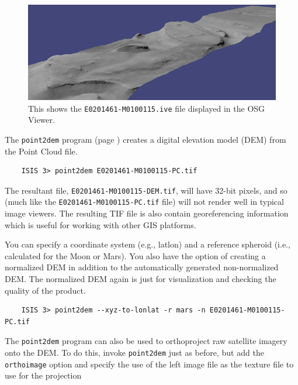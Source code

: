 \begin{figure}[t]
\begin{minipage}{5in}
\includegraphics[width=5in]{images/p19-osg.png}
\end{minipage}
\hfill
\begin{minipage}{1.7in}
\caption[P19 in OSG]{
    \label{p19-osg}
	This shows the \texttt{E0201461-M0100115.ive} file displayed in
	the OSG Viewer.
    }
\end{minipage}
\end{figure}

The \texttt{point2dem} program (page \pageref{point2dem}) creates
a digital elevation model (DEM) from the Point Cloud file.

\begin{verbatim}
    ISIS 3> point2dem E0201461-M0100115-PC.tif
\end{verbatim}

The resultant file, \texttt{E0201461-M0100115-DEM.tif}, will have
32-bit pixels, and so (much like the \texttt{E0201461-M0100115-PC.tif}
file) will not render well in typical image viewers. The resulting TIF
file is also contain georeferencing information which is useful for
working with other GIS platforms.

You can specify a coordinate system (e.g., latlon) and a reference
spheroid (i.e., calculated for the Moon or Mars). You also have the
option of creating a normalized DEM in addition to the automatically
generated non-normalized DEM. The normalized DEM again is just for
visualization and checking the quality of the product.

\begin{verbatim}
    ISIS 3> point2dem --xyz-to-lonlat -r mars -n E0201461-M0100115-PC.tif
\end{verbatim}

\noindent
The \texttt{point2dem} program can also be used to orthoproject raw
satellite imagery onto the DEM. To do this, invoke \texttt{point2dem}
just as before, but add the \texttt{orthoimage} option and specify
the use of the left image file as the texture file to use for the
projection

